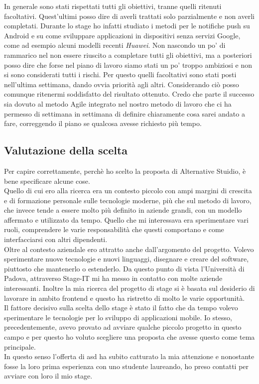 \noindent In generale sono stati rispettati tutti gli obiettivi, tranne quelli ritenuti facoltativi. Quest'ultimi posso
dire di averli trattati solo parzialmente e non averli completati. Durante lo stage ho infatti studiato i metodi per le
notifiche push su \gls{Android} e su come sviluppare applicazioni in dispositivi senza servizi Google, come ad esempio
alcuni modelli recenti \textit{Huawei}. Non nascondo un po' di rammarico nel non essere riuscito a completare tutti gli
obiettivi, ma a posteriori posso dire che forse nel piano di lavoro siamo stati un po' troppo ambiziosi e non si sono
considerati tutti i rischi. Per questo quelli facoltativi sono stati posti nell'ultima settimana, dando ovvia priorità
agli altri. Considerando ciò posso comunque ritenermi soddisfatto del risultato ottenuto. Credo che parte il
successo sia dovuto al metodo \gls{Agile} integrato nel nostro metodo di lavoro che ci ha permesso di settimana in
settimana di definire chiaramente cosa sarei andato a fare, correggendo il piano se qualcosa avesse richiesto più tempo. 

\subsection{Valutazione della scelta}

Per capire correttamente, perchè ho scelto la proposta di Alternative Stuidio, è bene specificare alcune cose. \\
\noindent Quello di cui ero alla ricerca era un contesto piccolo con ampi margini di crescita e di formazione personale
sulle tecnologie moderne, più che sul metodo di lavoro, che invece tende a essere molto più definito in aziende grandi,
con un modello affermato e utilizzato da tempo. Quello che mi interessava era sperimentare vari ruoli, comprendere le
varie responsabilità che questi comportano e come interfacciarsi con altri dipendenti. \\
Oltre al contesto aziendale ero attratto anche dall'argomento del progetto. Volevo sperimentare nuove tecnologie e nuovi linguaggi,
disegnare e creare del software, piuttosto che mantenerlo o estenderlo. Da questo punto di vista l'Università di Padova,
attraverso Stage-IT mi ha messo in contatto con molte aziende interessanti. Inoltre la mia ricerca del progetto di stage si è basata sul desiderio
di lavorare in ambito frontend e questo ha ristretto di molto le varie opportunità. \\
Il fattore decisivo sulla scelta dello stage è stato il fatto che da tempo volevo sperimentare le tecnologie per lo sviluppo di applicazioni
mobile. Io stesso, precedentemente, avevo provato ad avviare qualche piccolo progetto in questo campo e per questo ho voluto
scegliere una proposta che avesse questo come tema principale. \\
In questo senso l'offerta di \acrlong{asd} ha subito catturato la mia attenzione e nonostante fosse la loro prima esperienza con uno
studente laureando, ho preso contatti per avviare con loro il mio stage.

